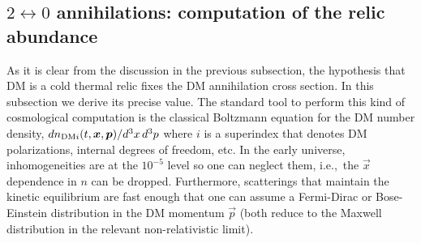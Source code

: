 \subsection{$2\leftrightarrow 0$ annihilations: computation of the relic abundance}
\label{sec:reliccomputation}
As it is clear from the discussion in the previous subsection, the hypothesis that DM is a cold thermal relic fixes the DM annihilation cross section.  
In this subsection we derive its precise value.
The standard tool to perform this kind of cosmological computation is the classical Boltzmann equation
for the DM number density, $dn_{{\rm DM}i}(t,\vec{x},\vec{p})/d^3x\, d^3p$ where $i$ is a superindex that denotes DM polarizations, internal degrees of freedom, etc.
In the early universe, inhomogeneities are at the $10^{-5}$ level so one can neglect them, i.e.,~the $\vec{x}$ dependence in $n$ can be dropped.
Furthermore, scatterings that maintain the kinetic equilibrium are fast enough
that one can assume a Fermi-Dirac or Bose-Einstein distribution in the DM momentum $\vec p$
(both reduce to the Maxwell distribution in the relevant non-relativistic limit).


